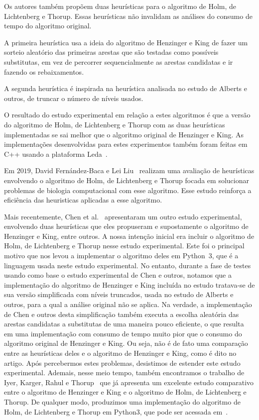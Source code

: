 Os autores também propõem duas heurísticas para o algoritmo de Holm, de Lichtenberg e Thorup. Essas heurísticas não invalidam as análises do consumo de tempo do algoritmo original.

A primeira heurística usa a ideia do algoritmo de Henzinger e King de fazer um sorteio aleatório das primeiras arestas que são testadas como possíveis substitutas, em vez de percorrer sequencialmente as arestas candidatas e ir fazendo os rebaixamentos.

A segunda heurística é inspirada na heurística analisada no estudo de Alberts e outros, de truncar o número de níveis usados.

O resultado do estudo experimental em relação a estes algoritmos é que a versão do algoritmo de Holm, de Lichtenberg e Thorup com as duas heurísticas implementadas se sai melhor que o algoritmo original de Henzinger e King.
As implementações desenvolvidas para estes experimentos também foram feitas em C++ usando a plataforma Leda~\cite{LEDA}.


Em $2019$, David Fernández-Baca e Lei Liu~\cite{xp-Phylogeny} realizam uma avaliação de heurísticas envolvendo o algoritmo de Holm, de Lichtenberg e Thorup focada em solucionar problemas de biologia computacional com esse algoritmo.
Esse estudo reinforça a eficiência das heuristicas aplicadas a esse algoritmo.


Mais recentemente, Chen et al.~\cite{QC22} apresentaram um outro estudo experimental, envolvendo duas heurísticas que eles propuseram e supostamente o algoritmo de Henzinger e King, entre outros.
A nossa intenção inicial era incluir o algoritmo de Holm, de Lichtenberg e Thorup nesse estudo experimental. Este foi o principal motivo que nos levou a implementar o algoritmo deles em Python~3, que é a linguagem usada neste estudo experimental.
No entanto, durante a fase de testes usando como base o estudo experimental de Chen e outros, notamos que a implementação do algoritmo de Henzinger e King incluída no estudo tratava-se de sua versão simplificada com níveis truncados, usada no estudo de Alberts e outros, para a qual a análise original não se aplica.
Na verdade, a implementação de Chen e outros desta simplificação também executa a escolha aleatória das arestas candidatas a substitutas de uma maneira pouco eficiente, o que resulta em uma implementação com consumo de tempo muito pior que o consumo do algoritmo original de Henzinger e King.
Ou seja, não é de fato uma comparação entre as heurísticas deles e o algoritmo de Henzinger e King, como é dito no artigo.
Após percebermos estes problemas, desistimos de estender este estudo experimental.
Ademais, nesse meio tempo, também encontramos o trabalho de Iyer, Karger, Rahul e Thorup~\cite{EmpiricalStudy2002} que já apresenta um excelente estudo comparativo entre o algoritmo de Henzinger e King e o algoritmo de Holm, de Lichtenberg e Thorup. 
De qualquer modo, produzimos uma implementação do algoritmo de Holm, de Lichtenberg e Thorup em Python3, que pode ser acessada em~\cite{github}.
